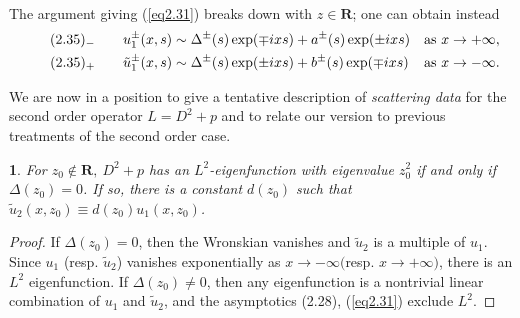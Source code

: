\documentclass{surv-l}
\theoremstyle{plain}
\newtheorem{prop}[theorem]{\sc{Proposition}}
\theoremstyle{definition}
\numberwithin{equation}{chapter}
\begin{document}
The argument giving (\ref{eq2.31}) breaks down with $z\in \mathbf{R}$; one can obtain instead
\begin{align*}\label{eq2.35-}
\tag*{$(2.35)_{-}$} \qquad  &u_{1}^{\pm}(x,s)\sim\Delta^{\pm}(s)\exp(\mp ixs)+a^{\pm}(s)\exp(\pm ixs) &\mathrm{as}\ x\rightarrow+\infty, \\\label{eq2.35+}
\tag*{$(2.35)_{+}$} \qquad  &\tilde{u}_{1}^{\pm}(x,s)\sim\Delta^{\pm}(s)\exp(\pm ixs)+b^{\pm}(s)\exp(\mp ixs) &\mathrm{as}\ x\rightarrow-\infty.
\end{align*}

We are now in a position to give a tentative description of \emph{scattering data} for the second order operator $L=D^{2}+p$ and to relate our version to previous treatments of the second order case.
\setcounter{theorem}{35}
\begin{prop}\label{chap01:prop2.36}For $z_{0}\not\in \mathbf{R},\ D^{2}+p$  has an $L^{2}$-eigenfunction with
eigenvalue $z_{0}^{2}$ if and only if $\Delta(z_{0})=0$. If so, there is a constant $d(z_{0})$ such that $\tilde{u}_{2}(x, z_{0})\equiv d(z_{0})u_{1}(x, z_{0})$.
\end{prop}

\begin{proof}
 If $\Delta (z_{0})=0$, then the Wronskian vanishes and $\tilde{u}_{2}$ is a multiple of $u_{1}$. Since $u_{1}$ (resp. $\tilde{u}_{2}$) vanishes exponentially as $x\rightarrow-\infty ($resp. $x\rightarrow+\infty)$, there is an $L^{2}$ eigenfunction. If $\Delta(z_{0})\neq 0$, then any eigenfunction is a nontrivial linear combination of $u_{1}$ and $\tilde{u}_{2}$, and the asymptotics (2.28), (\ref{eq2.31}) exclude $L^{2}$.
 \end{proof}
\end{document}
